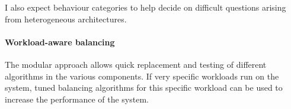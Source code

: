 I also expect behaviour categories to help decide on difficult questions
arising from heterogeneous architectures.


\paragraph{Workload-aware balancing}
The modular approach allows quick replacement and testing of different
algorithms in the various components.
If very specific workloads run on the system, tuned balancing algorithms for
this specific workload can be used to increase the performance of the system.


\cleardoublepage

